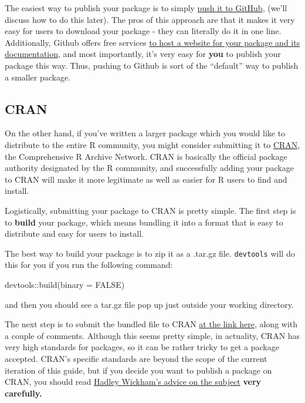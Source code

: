 \documentclass[
]{book}
\newenvironment{Shaded}{\begin{snugshade}}{\end{snugshade}}
\newcommand{\AttributeTok}[1]{\textcolor[rgb]{0.77,0.63,0.00}{#1}}
\newcommand{\ConstantTok}[1]{\textcolor[rgb]{0.00,0.00,0.00}{#1}}
\newcommand{\FunctionTok}[1]{\textcolor[rgb]{0.00,0.00,0.00}{#1}}
\newcommand{\NormalTok}[1]{#1}
\newcommand{\SpecialCharTok}[1]{\textcolor[rgb]{0.00,0.00,0.00}{#1}}
\begin{document}
The easiest way to publish your package is to simply \href{./version-control}{push it to GitHub}, (we'll discuss how to do this later). The pros of this approach are that it makes it very easy for users to download your package - they can literally do it in one line. Additionally, Github offers free services \href{https://pages.github.com/}{to host a website for your package and its documentation}, and most importantly, it's very easy for \textbf{you} to publish your package this way. Thus, pushing to Github is sort of the ``default'' way to publish a smaller package.

\hypertarget{cran}{%
\subsection{CRAN}\label{cran}}

On the other hand, if you've written a larger package which you would like to distribute to the entire R community, you might consider submitting it to \href{https://cran.r-project.org/}{CRAN}, the Comprehensive R Archive Network. CRAN is basically the official package authority designated by the R community, and successfully adding your package to CRAN will make it more legitimate as well as easier for R users to find and install.

Logistically, submitting your package to CRAN is pretty simple. The first step is to \textbf{build} your package, which means bundling it into a format that is easy to distribute and easy for users to install.

The best way to build your package is to zip it as a .tar.gz file. \texttt{devtools} will do this for you if you run the following command:

\begin{Shaded}
\begin{Highlighting}[]
\NormalTok{devtools}\SpecialCharTok{::}\FunctionTok{build}\NormalTok{(}\AttributeTok{binary =} \ConstantTok{FALSE}\NormalTok{)}
\end{Highlighting}
\end{Shaded}

and then you should see a tar.gz file pop up just outside your working directory.

The next step is to submit the bundled file to CRAN \href{https://cran.r-project.org/submit.html}{at the link here}, along with a couple of comments. Although this seems pretty simple, in actuality, CRAN has very high standards for packages, so it can be rather tricky to get a package accepted. CRAN's specific standards are beyond the scope of the current iteration of this guide, but if you decide you want to publish a package on CRAN, you should read \href{http://r-pkgs.had.co.nz/release.html}{Hadley Wickham's advice on the subject} \textbf{very carefully.}
\end{document}
